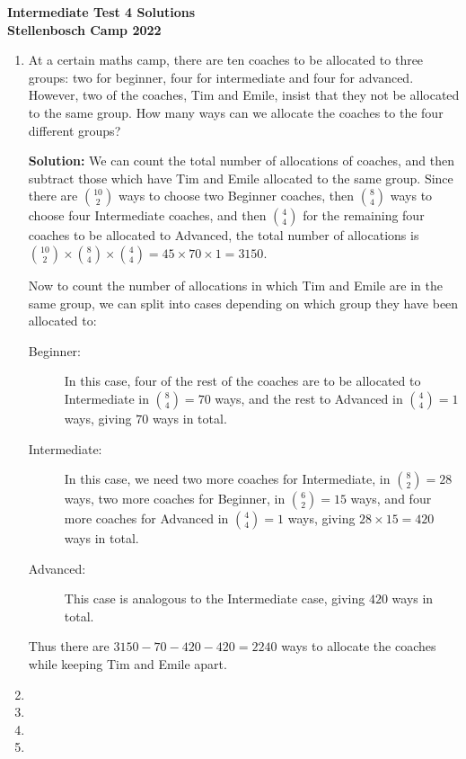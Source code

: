 \documentclass{article}
\begin{document}
\thispagestyle{empty}

\begin{center} \bfseries
  \Large Intermediate Test 4 Solutions
  \\ \vspace{12pt}
  \large Stellenbosch Camp 2022
\end{center}

\bigskip \bigskip

\begin{enumerate}[itemsep=24pt]

\item %
At a certain maths camp, there are ten coaches to be allocated to three groups: two for beginner, four for intermediate and four for advanced.
However, two of the coaches, Tim and Emile, insist that they not be allocated to the same group.
How many ways can we allocate the coaches to the four different groups?

\textbf{Solution:}
We can count the total number of allocations of coaches, and then subtract those which have Tim and Emile allocated to the same group.
Since there are $\binom{10}{2}$ ways to choose two Beginner coaches, then $\binom{8}{4}$ ways to choose four Intermediate coaches, and then $\binom{4}{4}$ for the remaining four coaches to be allocated to Advanced, the total number of allocations is $\binom{10}{2} \times \binom{8}{4} \times \binom {4}{4} = 45 \times 70 \times 1 = 3150$.

Now to count the number of allocations in which Tim and Emile are in the same group, we can split into cases depending on which group they have been allocated to:
\begin{description}
  \item[Beginner:] In this case, four of the rest of the coaches are to be allocated to Intermediate in $\binom{8}{4} = 70$ ways, and the rest to Advanced in $\binom{4}{4} = 1$ ways, giving $70$ ways in total.
  \item[Intermediate:] In this case, we need two more coaches for Intermediate, in $\binom{8}{2} = 28$ ways, two more coaches for Beginner, in $\binom{6}{2} = 15$ ways, and four more coaches for Advanced in $\binom{4}{4} = 1$ ways, giving $28 \times 15 = 420$ ways in total.
  \item[Advanced:] This case is analogous to the Intermediate case, giving $420$ ways in total.
\end{description}
Thus there are $3150 -70 -420 -420 = 2240$ ways to allocate the coaches while keeping Tim and Emile apart.


\item


\item 


\item 


\item


\end{enumerate}
\end{document}
